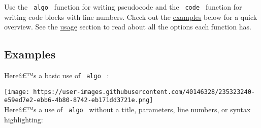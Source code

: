 \begin{Shaded}
\begin{Highlighting}[]
\end{Highlighting}
\end{Shaded}

Use the \texttt{\ algo\ } function for writing pseudocode and the
\texttt{\ code\ } function for writing code blocks with line numbers.
Check out the
\href{https://github.com/typst/packages/raw/main/packages/preview/algo/0.3.4/\#examples}{examples}
below for a quick overview. See the
\href{https://github.com/typst/packages/raw/main/packages/preview/algo/0.3.4/\#usage}{usage}
section to read about all the options each function has.

\subsection{Examples}\label{examples}

Hereâ€™s a basic use of \texttt{\ algo\ } :

\begin{Shaded}
\begin{Highlighting}[]
\NormalTok{)[}
\NormalTok{]}
\end{Highlighting}
\end{Shaded}

\texttt{[image: https://user-images.githubusercontent.com/40146328/235323240-e59ed7e2-ebb6-4b80-8742-eb171dd3721e.png]}\\

Hereâ€™s a use of \texttt{\ algo\ } without a title, parameters, line
numbers, or syntax highlighting:

\begin{Shaded}
\begin{Highlighting}[]
\NormalTok{)[}
\NormalTok{  \textbackslash{}}
\NormalTok{    \textbackslash{}}
\NormalTok{]}
\end{Highlighting}
\end{Shaded}

